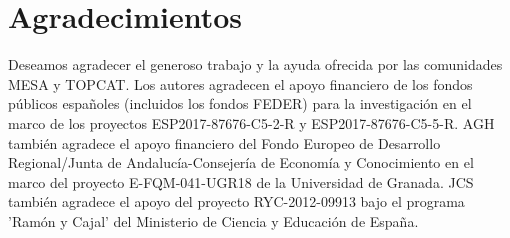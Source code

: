 \chapter{Agradecimientos}\label{ap:agradecimientos}
Deseamos agradecer el generoso trabajo y la ayuda ofrecida por las comunidades MESA y TOPCAT. Los autores agradecen el apoyo financiero de los fondos públicos españoles (incluidos los fondos FEDER) para la investigación en el marco de los proyectos ESP2017-87676-C5-2-R y ESP2017-87676-C5-5-R. AGH también agradece el apoyo financiero del Fondo Europeo de Desarrollo Regional/Junta de Andalucía-Consejería de Economía y Conocimiento en el marco del proyecto E-FQM-041-UGR18 de la Universidad de Granada. JCS también agradece el apoyo del proyecto RYC-2012-09913 bajo el programa 'Ram\'on y Cajal' del Ministerio de Ciencia y Educación de España.
\endinput
